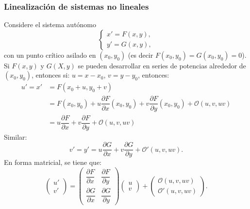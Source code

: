 \documentclass[a5paper,doc,10pt,noapacite]{apa6}
\begin{document}
{{\subsubsection{Linealización de sistemas no lineales}
%
%
%
Considere el sistema autónomo
\begin{equation}\label{m-11}
	\begin{cases}
		x'=F(x,y) ,
		\\
		y'=G(x,y),
	\end{cases}
\end{equation}
con un punto crítico asilado en \((x_0,y_0)\) (es decir \(F(x_0,y_0)=G(x_0,y_0)=0\)). Si \(F(x,y)\) y \(G(X,y)\) se pueden desarrollar en series de potencias alrededor de \((x_0,y_0)\), entonces si: \(u=x-x_0\), \(v=y-y_0\), entonces:
\begin{align}
	u'=x'&=F(x_0+u,y_0+v)\nonumber\\
		&=F(x_0,y_0)+u\dfrac{\partial F}{\partial x}(x_0,y_0)+v\dfrac{\partial F}{\partial y}(x_0,y_0)+\mathcal{O}(u,v,uv)\nonumber\\
		&=u\dfrac{\partial F}{\partial x}+v\dfrac{\partial F}{\partial y}+\mathcal{O}(u,v,uv)\label{m-12}
\end{align}
Similar:
\begin{equation}\label{m-13}
	v'=y'=u\dfrac{\partial G}{\partial x}+v\dfrac{\partial G}{\partial y}+\mathcal{O}'(u,v,uv).
\end{equation}
En forma matricial, se tiene que:
\begin{equation}\label{m-14}
	\begin{pmatrix} u' \\ v' \end{pmatrix}
	= \begin{pmatrix} \dfrac{\partial F}{\partial x} & \dfrac{\partial F}{\partial y} \\
\dfrac{\partial G}{\partial x} & \dfrac{\partial G}{\partial y} \end{pmatrix} \begin{pmatrix} u \\ v\end{pmatrix}+\begin{pmatrix} \mathcal{O}(u,v,uv) \\ \mathcal{O}'(u,v,uv)\end{pmatrix}.
\end{equation}

}}
\end{document}
